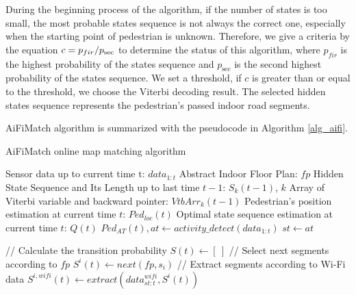 \documentclass{llncs}
\begin{document}
During the beginning process of the algorithm, if the number of states is too small, the most probable states sequence is not always the correct one, especially when the starting point of pedestrian is unknown. Therefore, we give a criteria by the equation $c = {{{p_{fir}}} \mathord{\left/
		{\vphantom {{{p_{fir}}} {{p_{\sec }}}}} \right.
		\kern-\nulldelimiterspace} {{p_{\sec }}}}$ to determine the status of this algorithm, where ${p_{fir}}$ is the highest probability of the states sequence and ${p_{\sec }}$ is the second highest probability of the states sequence. We set a threshold, if $c$ is greater than or equal to the threshold, we choose the Viterbi decoding result. The selected hidden states sequence represents the pedestrian's passed indoor road segments.

AiFiMatch algorithm is summarized with the pseudocode in Algorithm \ref{alg_aifi}.  

\vspace{-10pt}
\begin{algorithm}[H]
	\caption{AiFiMatch online map matching algorithm}
	\label{alg_aifi}
	\begin{algorithmic}[1]
		\renewcommand{\algorithmicrequire}{\textbf{Input:}}
		\renewcommand{\algorithmicensure}{\textbf{Output:}}
		\REQUIRE Sensor data up to current time t: $data_{1:t}$
		\REQUIRE Abstract Indoor Floor Plan: $fp$
		\REQUIRE Hidden State Sequence and Its Length up to last time $t-1$: $S_{k}(t-1)$, $k$
		\REQUIRE Array of Viterbi variable and backward pointer: ${VtbArr}_{k}(t-1)$
		\ENSURE Pedestrian's position estimation at current time $t$: $Ped_{loc}(t)$
		\ENSURE Optimal state sequence estimation at current time $t$: $Q(t)$
		\STATE ${Ped_{AT}(t)}, at \leftarrow activity\_detect({data_{1:t}})$
		\STATE ${st} \leftarrow {at}$  
		
		\STATE // Calculate the transition probability
		\STATE $S(t) \leftarrow [\ ]$
		\STATE // Select next segments according to $fp$
		\STATE $S^{i}(t) \leftarrow next(fp,s_i)$
		\STATE // Extract segments according to Wi-Fi data
		\STATE $S^{i,wifi}(t) \leftarrow extract(data_{st:t}^{wifi},S^{i}(t))$
				
	\end{algorithmic}
\end{algorithm}
		
\end{document}
